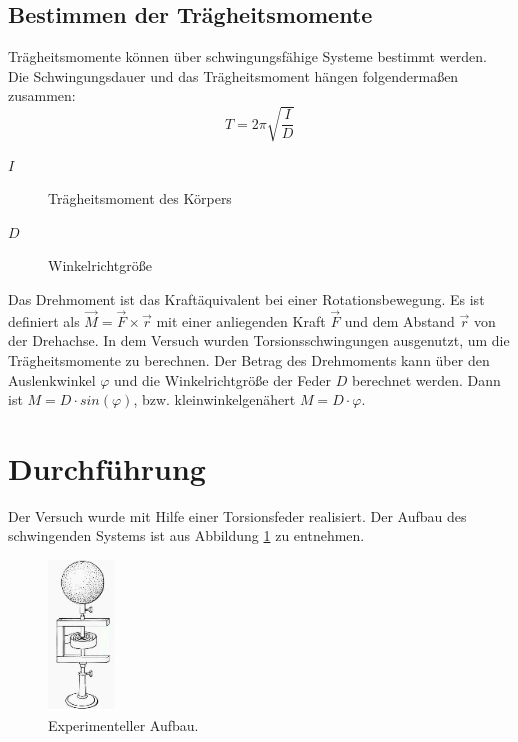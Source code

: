 \subsection{Bestimmen der Trägheitsmomente}
Trägheitsmomente können über schwingungsfähige Systeme bestimmt werden. Die Schwingungsdauer und das Trägheitsmoment hängen folgendermaßen zusammen:
\begin{equation}
  T = 2\pi \sqrt{\frac{I}{D}}
\end{equation}
\begin{description}
  \item[$I$]Trägheitsmoment des Körpers
  \item[$D$]Winkelrichtgröße
\end{description}
Das Drehmoment ist das Kraftäquivalent bei einer Rotationsbewegung. Es ist definiert als $\vec{M} = \vec{F} \times \vec{r}$ mit einer anliegenden Kraft $\vec{F}$ und dem Abstand $\vec{r}$ von der Drehachse.
In dem Versuch wurden Torsionsschwingungen ausgenutzt, um die Trägheitsmomente zu berechnen. Der Betrag des Drehmoments kann über den Auslenkwinkel $\varphi$ und die Winkelrichtgröße der Feder $D$ berechnet werden. Dann ist $M = D\cdot sin(\varphi)$, bzw. kleinwinkelgenähert $M = D\cdot\varphi$.
\section{Durchführung}
Der Versuch wurde mit Hilfe einer Torsionsfeder realisiert. Der Aufbau des schwingenden Systems ist aus Abbildung \ref{fig:Aufbau} zu entnehmen.
\begin{figure}
  \centering
  \includegraphics[height=4.00cm]{V101_Aufbau.png}
  \caption{Experimenteller Aufbau.\cite{anleitung01}}
  \label{fig:Aufbau}
\end{figure}
\FloatBarrier
